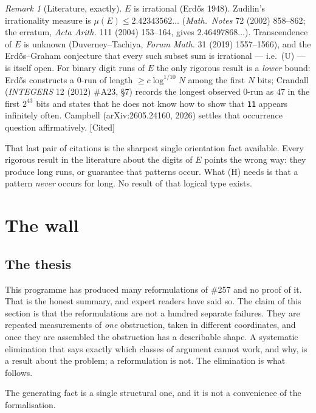 \documentclass[11pt]{article}
\theoremstyle{plain}
\theoremstyle{definition}
\theoremstyle{remark}
\newtheorem{rem}[thm]{Remark}
\newcommand{\ev}[1]{{\small\textsf{[#1]}}\xspace}
\begin{document}
\begin{rem}[Literature, exactly]
$E$ is irrational (Erd\H{o}s 1948). Zudilin's irrationality measure is
$\mu(E) \le 2.42343562\ldots$ (\emph{Math.\ Notes} 72 (2002) 858--862; the erratum, \emph{Acta
Arith.} 111 (2004) 153--164, gives $2.46497868\ldots$). Transcendence of $E$ is unknown
(Duverney--Tachiya, \emph{Forum Math.} 31 (2019) 1557--1566), and the Erd\H{o}s--Graham conjecture
that every such subset sum is irrational --- i.e.\ (U) --- is itself open. For binary digit runs of
$E$ the only rigorous result is a \emph{lower} bound: Erd\H{o}s constructs a $0$-run of length
$\ge c \log^{1/10} N$ among the first $N$ bits; Crandall (\emph{INTEGERS} 12 (2012) \#A23, \S7)
records the longest observed $0$-run as $47$ in the first $2^{43}$ bits and states that he does not
know how to show that \texttt{11} appears infinitely often. Campbell (arXiv:2605.24160, 2026)
settles that occurrence question affirmatively. \ev{Cited}
\end{rem}

That last pair of citations is the sharpest single orientation fact available. Every rigorous
result in the literature about the digits of $E$ points the wrong way: they produce long runs, or
guarantee that patterns occur. What (H) needs is that a pattern \emph{never} occurs for long. No
result of that logical type exists.

\section{The wall}
\label{sec:257-wall}

\subsection{The thesis}

This programme has produced many reformulations of \#257 and no proof of it. That is the honest
summary, and expert readers have said so. The claim of this section is that the reformulations are
not a hundred separate failures. They are repeated measurements of \emph{one} obstruction, taken in
different coordinates, and once they are assembled the obstruction has a describable shape. A
systematic elimination that says exactly which classes of argument cannot work, and why, is a
result about the problem; a reformulation is not. The elimination is what follows.

The generating fact is a single structural one, and it is not a convenience of the formalisation.
\end{document}
